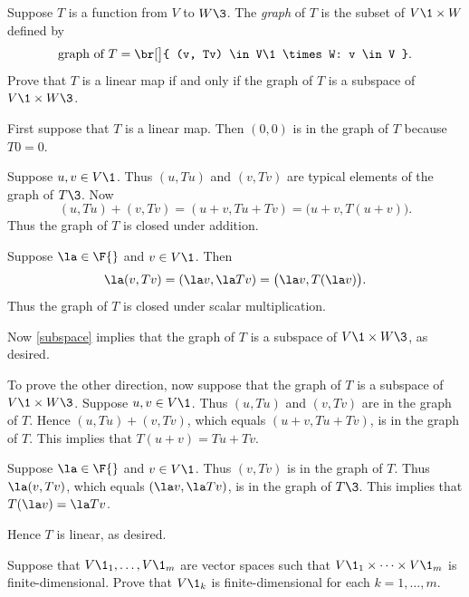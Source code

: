 
\exercise
Suppose $T$ is a function from $V$ to $W\3$. The \emph{graph} of $T$ is the subset of
$V\1 \times W$ defined by
\[
\text{graph of}\ T = \br[\big]{ (v, Tv) \in V\1 \times W: v \in V }.
\]
Prove that $T$ is a linear map if and only if the graph of $T$
is a subspace of $V\1 \times W\3$.

\begin{Solution}
First suppose that $T$ is a linear map. Then $(0, 0)$ is in the graph of $T$ because $T0 = 0$.

Suppose $u, v \in V\1$. Thus $(u, Tu)$ and $(v, Tv)$ are typical elements of the graph of $T\3$. Now
\[
(u, Tu) + (v, Tv) = (u + v, Tu + Tv) = \bigl( u+v, T(u+v) \bigr).
\]
Thus the graph of $T$ is closed under addition.

Suppose $\la \in \F{}$ and $v \in V\1$. Then
\[
\la(v, Tv) = (\la v, \la Tv) = \bigl( \la v, T(\la v) \bigr).
\]
Thus the graph of $T$ is closed under scalar multiplication.

Now \ref{subspace} implies that the graph of $T$ is a subspace of $V\1 \times W\3$, as desired.

To prove the other direction, now suppose that the graph of $T$ is a subspace of $V\1 \times W\3$. Suppose $u, v \in V\1$. Thus $(u, Tu)$ and $(v, Tv)$ are in the graph of $T$\!. Hence $(u, Tu) + (v, Tv)$, which equals $(u+v, Tu + Tv)$, is in the graph of $T$\!. This implies that $T(u+v) = Tu + Tv$.

Suppose $\la \in \F{}$ and $v \in V\1$. Thus $(v, Tv)$ is in the graph of $T$\!. Thus $\la(v, Tv)$, which equals
$(\la v, \la Tv)$, is in the graph of $T\3$. This implies that $T(\la v) = \la Tv$.

Hence $T$ is linear, as desired.
\end{Solution}

\exercise
Suppose that $V\1_1, \dots, V\1_m$ are vector spaces such that $V\1_1 \times \dots \times V\1_m$ is finite-dimensional. Prove that $V\1_k$ is finite-dimensional for each $k = 1, \dots, m$.

